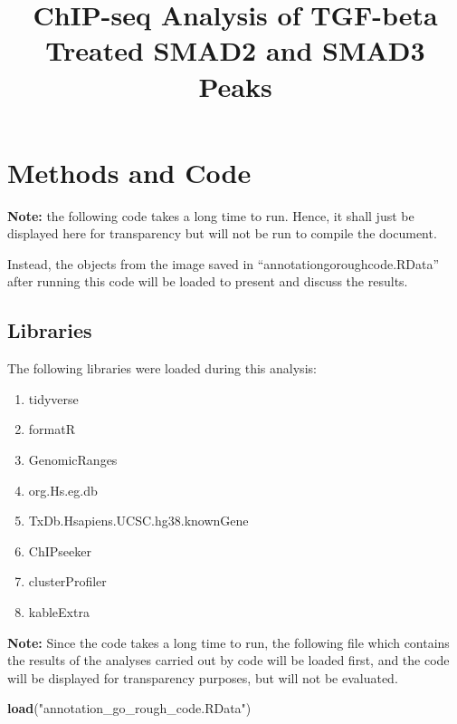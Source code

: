 \documentclass[]{article}
\title{ChIP-seq Analysis of TGF-beta Treated SMAD2 and SMAD3 Peaks}
\author{}
\date{}
\newenvironment{Shaded}{\begin{snugshade}}{\end{snugshade}}
\newcommand{\KeywordTok}[1]{\textcolor[rgb]{0.13,0.29,0.53}{\textbf{#1}}}
\newcommand{\NormalTok}[1]{#1}
\newcommand{\StringTok}[1]{\textcolor[rgb]{0.31,0.60,0.02}{#1}}
\begin{document}
\maketitle

\clearpage{}

\tableofcontents

\clearpage{}


\section{Methods and Code}

\textbf{Note:} the following code takes a long time to run. Hence, it
shall just be displayed here for transparency but will not be run to
compile the document.

Instead, the objects from the image saved in
``annotation\textunderscore go\textunderscore rough\textunderscore code.RData''
after running this code will be loaded to present and discuss the
results.


\subsection{Libraries}

The following libraries were loaded during this analysis:

\begin{enumerate}
\def\labelenumi{\arabic{enumi}.}
\item
  tidyverse
\item
  formatR
\item
  GenomicRanges
\item
  org.Hs.eg.db
\item
  TxDb.Hsapiens.UCSC.hg38.knownGene
\item
  ChIPseeker
\item
  clusterProfiler
\item
  kableExtra
\end{enumerate}

\textbf{Note:} Since the code takes a long time to run, the following
file which contains the results of the analyses carried out by code will
be loaded first, and the code will be displayed for transparency
purposes, but will not be evaluated.

\begin{Shaded}
\begin{Highlighting}[]
\KeywordTok{load}\NormalTok{(}\StringTok{"annotation_go_rough_code.RData"}\NormalTok{)}
\end{Highlighting}
\end{Shaded}
\end{document}
